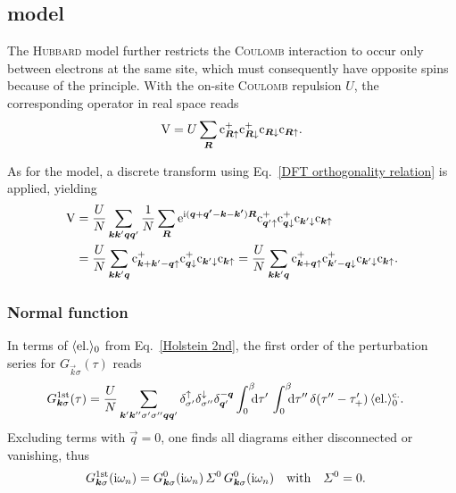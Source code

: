 \subsection{ model}
\label{Hubbard model}

The \textsc{Hubbard} model further restricts the \textsc{Coulomb} interaction to
occur only between electrons at the same site, which must consequently have
opposite spins because of the  principle. With the on-site
\textsc{Coulomb} repulsion $U$, the corresponding operator in real space reads
%
\begin{equation*}
    \mathrm V = U \sum_{\boldsymbol R}
    \mathrm c_{\boldsymbol R \uparrow}^+
    \mathrm c_{\boldsymbol R \downarrow}^+
    \mathrm c_{\boldsymbol R \downarrow}
    \mathrm c_{\boldsymbol R \uparrow}.
\end{equation*}

As for the  model, a discrete  transform using
Eq.~\ref{DFT orthogonality relation} is applied, yielding
%
\begin{align*}
    \mathrm V &=
    \frac U N \sum_{\boldsymbol k \boldsymbol k' \boldsymbol q \boldsymbol q'}
    \frac 1 N \sum_{\boldsymbol R}
    \mathrm e^{\mathrm i (\boldsymbol q + \boldsymbol{q'} - \boldsymbol k - \boldsymbol{k'}) \boldsymbol R}
    \mathrm c_{\boldsymbol q' \uparrow}^+
    \mathrm c_{\boldsymbol q \downarrow}^+
    \mathrm c_{\boldsymbol k' \downarrow}
    \mathrm c_{\boldsymbol k \uparrow}
    \\
    &= \frac U N \sum_{\boldsymbol k \boldsymbol k' \boldsymbol q}
    \mathrm c_{\boldsymbol k + \boldsymbol k' - \boldsymbol q \uparrow}^+
    \mathrm c_{\boldsymbol q \downarrow}^+
    \mathrm c_{\boldsymbol k' \downarrow}
    \mathrm c_{\boldsymbol k \uparrow}
    = \frac U N \sum_{\boldsymbol k \boldsymbol k' \boldsymbol q}
    \mathrm c_{\boldsymbol k + \boldsymbol q \uparrow}^+
    \mathrm c_{\boldsymbol k' - \boldsymbol q \downarrow}^+
    \mathrm c_{\boldsymbol k' \downarrow} \mathrm c_{\boldsymbol k \uparrow}.
\end{align*}

\subsubsection{Normal  function}

In terms of $\langle\text{el.}\rangle_0$ from Eq.~\ref{Holstein 2nd}, the first order of
the perturbation series for $G_{\vec k \sigma}(\tau)$ reads
%
\begin{align*}
    G \super{1st}_{\vec k \sigma}(\tau) &=
    \frac U N \sum_{\vec k' \vec k'' \sigma' \sigma'' \vec q \vec q'}
    \delta_{\sigma'}^\up \delta_{\sigma''}^\down \delta_{\vec q'}^{-\vec q}
    \int \from 0 \till \beta \D \tau' \,
    \int \from 0 \till \beta \D \tau'' \,
    \delta(\tau'' - \tau'_+) \,
    \av{\text{el.}}_0 \super{c.}.
\end{align*}
%
Excluding terms with $\vec q = 0$, one finds all diagrams either disconnected or
vanishing, thus
%
\begin{align*}
    G \sp{\text{1st}}_{\boldsymbol k \sigma}(\mathrm i \omega_n)
    &= G^0_{\boldsymbol k \sigma}(\mathrm i \omega_n) \,
    \varSigma^0 \,
    G^0_{\boldsymbol k \sigma}(\mathrm i \omega_n)
    \quad \text{with} \quad
    \varSigma^0 = 0.
\end{align*}

